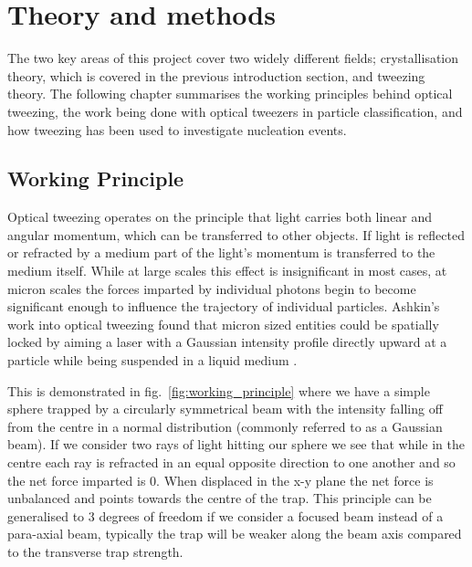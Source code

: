 \chapter{Theory and methods}
\label{chapter:theory}
The two key areas of this project cover two widely different fields; 
crystallisation theory, which is covered in the previous introduction 
section, and tweezing theory. The following chapter summarises the 
working principles behind optical tweezing, the work being done with 
optical tweezers in particle classification, and how tweezing has been 
used to investigate nucleation events. 

\section{Working Principle}

Optical tweezing operates on the principle that light carries both
linear and angular momentum, which can be transferred to other
objects. If light is reflected or refracted by a medium part of the
light's momentum is transferred to the medium itself. While at large
scales this effect is insignificant in most cases, at micron scales
the forces imparted by individual photons begin to become significant
enough to influence the trajectory of individual particles. Ashkin's 
work into optical tweezing found that micron sized entities could be 
spatially locked by aiming a laser with a Gaussian intensity profile 
directly upward at a particle while being suspended in a liquid 
medium \cite{Ashkin1970}. 

This is demonstrated in fig.~\ref{fig:working_principle} where we have 
a simple sphere trapped by a circularly symmetrical beam with the intensity
falling off from the centre in a normal distribution (commonly referred to
as a Gaussian beam). If we consider two rays of light hitting our sphere 
we see that while in the centre each ray is refracted in an equal opposite 
direction to one another and so the net force imparted is 0. When displaced 
in the x-y plane the net force is unbalanced and points towards the centre 
of the trap. This principle can be generalised to 3 degrees of freedom if we 
consider a focused beam instead of a para-axial beam, typically the trap will be
weaker along the beam axis compared to the transverse trap strength.

